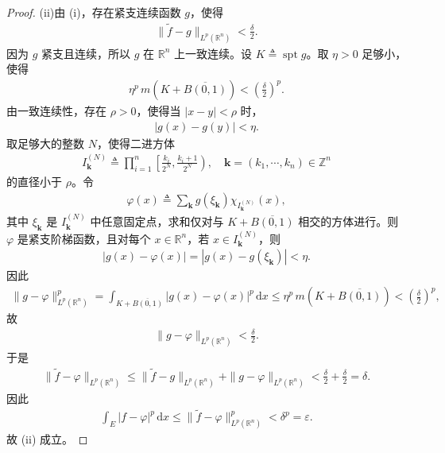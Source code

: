 \documentclass[../../main.tex]{subfiles}%
\begin{document}
\begin{proof}
(ii)由 (i)，存在紧支连续函数 \(g\)，使得
\begin{align*}
\|\widetilde f-g\|_{L^p(\mathbb{R}^n)}<\frac{\delta}{2}.
\end{align*}
因为 \(g\) 紧支且连续，所以 \(g\) 在 \(\mathbb{R}^n\) 上一致连续。设 \(K\triangleq\operatorname{spt}g\)。取 \(\eta>0\) 足够小，使得
\begin{align*}
\eta^p\,m(K+\overline{B(0,1)})<\left(\frac{\delta}{2}\right)^p.
\end{align*}
由一致连续性，存在 \(\rho>0\)，使得当 \(|x-y|<\rho\) 时，
\begin{align*}
|g(x)-g(y)|<\eta.
\end{align*}
取足够大的整数 \(N\)，使得二进方体
\begin{align*}
I_{\mathbf{k}}^{(N)}\triangleq\prod_{i=1}^n\left[\frac{k_i}{2^N},\frac{k_i+1}{2^N}\right),\quad
\mathbf{k}=(k_1,\cdots,k_n)\in\mathbb{Z}^n
\end{align*}
的直径小于 \(\rho\)。令
\begin{align*}
\varphi(x)\triangleq\sum_{\mathbf{k}} g(\xi_{\mathbf{k}})\chi_{I_{\mathbf{k}}^{(N)}}(x),
\end{align*}
其中 \(\xi_{\mathbf{k}}\) 是 \(I_{\mathbf{k}}^{(N)}\) 中任意固定点，求和仅对与 \(K+\overline{B(0,1)}\) 相交的方体进行。则 \(\varphi\) 是紧支阶梯函数，且对每个 \(x\in\mathbb{R}^n\)，若 \(x\in I_{\mathbf{k}}^{(N)}\)，则
\begin{align*}
|g(x)-\varphi(x)|=|g(x)-g(\xi_{\mathbf{k}})|<\eta.
\end{align*}
因此
\begin{align*}
\|g-\varphi\|_{L^p(\mathbb{R}^n)}^p
=\int_{K+\overline{B(0,1)}}|g(x)-\varphi(x)|^p\,\mathrm{d}x
\leqslant\eta^p\,m(K+\overline{B(0,1)})
<\left(\frac{\delta}{2}\right)^p,
\end{align*}
故
\begin{align*}
\|g-\varphi\|_{L^p(\mathbb{R}^n)}<\frac{\delta}{2}.
\end{align*}
于是
\begin{align*}
\|\widetilde f-\varphi\|_{L^p(\mathbb{R}^n)}
\leqslant\|\widetilde f-g\|_{L^p(\mathbb{R}^n)}+\|g-\varphi\|_{L^p(\mathbb{R}^n)}
<\frac{\delta}{2}+\frac{\delta}{2}=\delta.
\end{align*}
因此
\begin{align*}
\int_E |f-\varphi|^p\,\mathrm{d}x
\leqslant\|\widetilde f-\varphi\|_{L^p(\mathbb{R}^n)}^p
<\delta^p=\varepsilon.
\end{align*}
故 (ii) 成立。
\end{proof}
\end{document}
